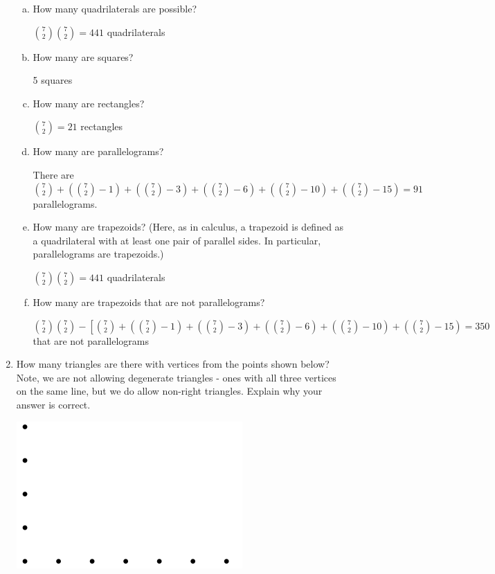 \documentclass[11pt, a4paper]{article}
\begin{document}
\begin{enumerate}
            \begin{enumerate}[(a)]
                \item How many quadrilaterals are possible?

                ${7\choose 2}{7\choose 2} = 441$ quadrilaterals

                \item How many are squares?

                5 squares

                \item How many are rectangles?

                ${7\choose 2} = 21$ rectangles

                \item How many are parallelograms?

                There are ${7\choose 2} + ({7\choose 2} - 1) + ({7\choose 2} - 3) + ({7\choose 2} - 6) + ({7\choose 2} - 10) + ({7\choose 2} - 15) = 91$ parallelograms.

                \item How many are trapezoids? (Here, as in calculus, a trapezoid is defined as a quadrilateral with at least one pair of parallel sides. In particular, parallelograms are trapezoids.)

                ${7\choose 2}{7\choose 2} = 441$ quadrilaterals

                \item How many are trapezoids that are not parallelograms?


${7\choose 2}{7\choose 2} - \left[ {7 \choose 2} + ({7 \choose 2}-1) + ({7 \choose 2} - 3) + ({7 \choose 2} - 6) + ({7 \choose 2} - 10) + ({7 \choose 2} - 15) = 350$ that are not parallelograms

            \end{enumerate}

        \item How many triangles are there with vertices from the points shown below? Note, we are not allowing degenerate triangles - ones with all three vertices on the same line, but we do allow non-right triangles. Explain why your answer is correct.

            \begin{center}
            \includegraphics[width=.5\textwidth]{hw4_graphic2}
            \end{center}


\end{enumerate}
\end{document}

